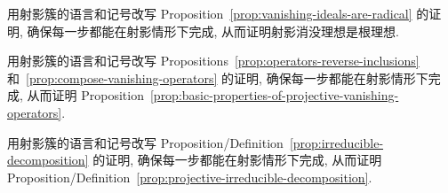 \begin{BookExercises}
  \item\label{ex:adapt-affine-proof-of-radical-ideal-to-projective-space} 用射影簇的语言和记号改写 Proposition~\ref{prop:vanishing-ideals-are-radical} 的证明, 确保每一步都能在射影情形下完成, 从而证明射影消没理想是根理想.
  \item\label{ex:adapt-affine-proof-of-operator-properties-to-projective-space} 用射影簇的语言和记号改写 Propositions~\ref{prop:operators-reverse-inclusions} 和~\ref{prop:compose-vanishing-operators} 的证明, 确保每一步都能在射影情形下完成, 从而证明 Proposition~\ref{prop:basic-properties-of-projective-vanishing-operators}.
  \item\label{ex:adapt-affine-proof-of-decomposition-to-projective-space} 用射影簇的语言和记号改写 Proposition/Definition~\ref{prop:irreducible-decomposition} 的证明, 确保每一步都能在射影情形下完成, 从而证明 Proposition/Definition~\ref{prop:projective-irreducible-decomposition}.
\end{BookExercises}
